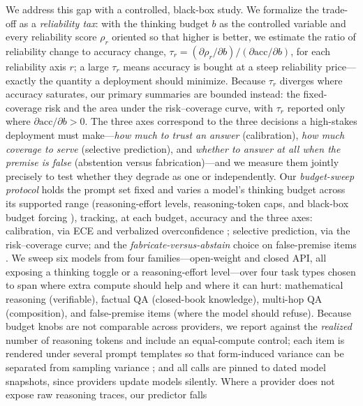 \documentclass[11pt]{article}
\begin{document}
We address this gap with a controlled, black-box study.
We formalize the trade-off as a \emph{reliability tax}: with the thinking
budget $b$ as the controlled variable and every reliability score $\rho_r$
oriented so that higher is better, we estimate the ratio of reliability change
to accuracy change,
$\tau_r = (\partial \rho_r / \partial b) / (\partial \mathrm{acc} / \partial b)$,
for each reliability axis $r$; a large $\tau_r$ means accuracy is bought at a
steep reliability price---exactly the quantity a deployment should minimize.
Because $\tau_r$ diverges where accuracy saturates, our primary summaries are
bounded instead: the fixed-coverage risk and the area under the
risk--coverage curve, with $\tau_r$ reported only where
$\partial \mathrm{acc}/\partial b > 0$.
The three axes correspond to the three decisions a high-stakes deployment must
make---\emph{how much to trust an answer} (calibration), \emph{how much
coverage to serve} (selective prediction), and \emph{whether to answer at all
when the premise is false} (abstention versus fabrication)---and we measure
them jointly precisely to test whether they degrade as one or independently.
Our \emph{budget-sweep protocol} holds the prompt set fixed and varies a
model's thinking budget across its supported range (reasoning-effort levels,
reasoning-token caps, and black-box budget forcing \citep{Muennighoff2025s1}),
tracking, at each budget, accuracy and the three axes: calibration, via ECE
and verbalized overconfidence \citep{Kadavath2022KnowWhatTheyKnow,
Tian2023JustAsk}; selective prediction, via the risk--coverage curve; and the
\emph{fabricate-versus-abstain} choice on false-premise items
\citep{Sathyanathan2025Presuppositions, Xu2026Presupposition}.
We sweep six models from four families---open-weight and closed API, all
exposing a thinking toggle or a reasoning-effort level---over four task types
chosen to span where extra compute should help and where it can hurt:
mathematical reasoning (verifiable), factual QA (closed-book knowledge),
multi-hop QA (composition), and false-premise items (where the model should
refuse).
Because budget knobs are not comparable across providers, we report against
the \emph{realized} number of reasoning tokens and include an equal-compute
control; each item is rendered under several prompt templates so that
form-induced variance can be separated from sampling variance
\citep{Miller2024ErrorBars, Zhang2025BeyondSingular}; and all calls are pinned
to dated model snapshots, since providers update models silently.
Where a provider does not expose raw reasoning traces, our predictor falls
\end{document}

